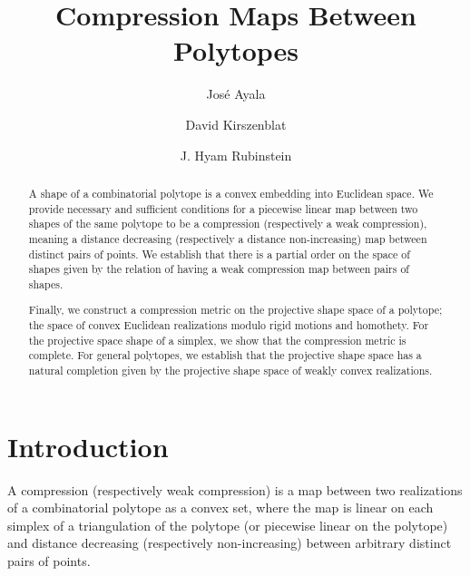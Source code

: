 \documentclass[a4paper, 12pt]{amsart}
\theoremstyle{plain}
\begin{document}
\title{Compression Maps Between Polytopes}

\author{Jos\'{e} Ayala}

\address{Universidad de Tarapacá, Casilla 7D, Iquique, Chile} 
\author{David Kirszenblat}
\address{School of Mathematics and Statistics, University of Melbourne
              Parkville, VIC 3010 Australia}
\author{J. Hyam Rubinstein}
\address{School of Mathematics and Statistics, University of Melbourne
              Parkville, VIC 3010 Australia}
\maketitle

\begin{abstract} 
A shape of a combinatorial polytope is a convex embedding into Euclidean space. We provide necessary and sufficient conditions for a piecewise linear map between two shapes of the same polytope to be a compression (respectively a weak compression), meaning a distance decreasing (respectively a distance non-increasing) map between distinct pairs of points. We establish that there is a partial order on the space of shapes given by the relation of having a weak compression map between pairs of shapes.

Finally, we construct a compression metric on the projective shape space of a polytope; the space of convex Euclidean realizations modulo rigid motions and homothety. For the projective space shape of a simplex, we show that the compression metric is complete. For general polytopes, we establish that the projective shape space has a natural completion given by the projective shape space of weakly convex realizations. 
\end{abstract}

\section{Introduction}

 A compression (respectively weak compression) is a map between two realizations of a combinatorial polytope as a convex set, where the map is linear on each simplex of a triangulation of the polytope (or piecewise linear on the polytope) and distance decreasing (respectively non-increasing) between arbitrary distinct pairs of points. 
 
\end{document}
